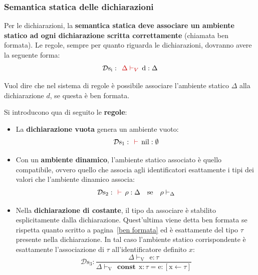 \documentclass[a4paper]{article}
\begin{document}
	\subsubsection{Semantica statica delle dichiarazioni}
	
	Per le dichiarazioni, la \textbf{semantica statica deve associare un ambiente statico ad ogni dichiarazione scritta correttamente} (chiamata ben formata). Le regole, sempre per quanto riguarda le dichiarazioni, dovranno avere la seguente forma:
	\begin{equation*}
		\mathcal{D}\mathrm{s}_{\mathrm{i}}: \:\: \textcolor{Red3}{\Delta\vdash_{V}} \:\: \mathrm{d}:\Delta
	\end{equation*}
	
	\noindent
	Vuol dire che nel sistema di regole è possibile associare l'ambiente statico $\Delta$ alla dichiarazione $d$, se questa è ben formata.\newline
	
	\noindent
	Si introducono qua di seguito le \textbf{regole}:
	\begin{itemize}
		\item La \textbf{dichiarazione vuota} genera un ambiente vuoto:
		\begin{equation*}
			\mathcal{D}\mathrm{s}_{1}: \:\: \textcolor{Red3}{\vdash} \:\: \mathrm{nil}:\emptyset
		\end{equation*}
		
		\item Con un \textbf{ambiente dinamico}, l'ambiente statico associato è quello compatibile, ovvero quello che associa agli identificatori esattamente i tipi dei valori che l'ambiente dinamico associa:
		\begin{equation*}
			\mathcal{D}\mathrm{s}_{2}: \:\: \textcolor{Red3}{\vdash} \:\: \rho:\Delta \hspace{1em} \mathrm{se} \hspace{1em} \rho \vdash_{\Delta}
		\end{equation*}
		
		\item Nella \textbf{dichiarazione di costante}, il tipo da associare è stabilito esplicitamente dalla dichiarazione. Quest'ultima viene detta ben formata se rispetta quanto scritto a pagina~\ref{ben formata} ed è esattamente del tipo $\tau$ presente nella dichiarazione. In tal caso l'ambiente statico corrispondente è esattamente l'associazione di $\tau$ all'identificatore definito $x$:
		\begin{equation*}
			\mathcal{D}\mathrm{s}_{3} : \dfrac{
				\Delta\vdash_{\mathrm{V}} \:\: \mathrm{e}:\tau
			}{
				\Delta\vdash_{\mathrm{V}} \:\: \mathbf{const} \:\: \mathrm{x}:\tau = \mathrm{e} : \left[\mathrm{x} \leftarrow \tau\right]
			}
		\end{equation*}
	\end{itemize}\newpage
\end{document}
